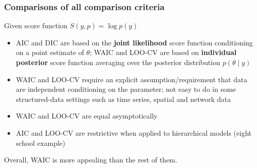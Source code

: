 \documentclass{beamer}
\begin{document}
\begin{frame}
  \frametitle{Comparisons of all comparison criteria}
Given score function $S(y, p) = \log p(y)$
  \begin{itemize}
  \item AIC and DIC are based on the {\bf joint likelihood} score function
    conditioning on a point estimate of $\theta$; WAIC and LOO-CV are
    based on {\bf individual posterior} score function averaging over the posterior distribution $p(\theta \mid
    y)$
\pause
\item WAIC and LOO-CV require an explicit assumption/requirement that data are
  independent conditioning on the parameter; not easy to do in some
  structured-data settings such as time series, spatial and network
  data
\pause
\item WAIC and LOO-CV are equal asymptotically 
\pause
\item AIC and LOO-CV are restrictive when applied to hierarchical
  models (eight school example)
\pause
  \end{itemize}

Overall, WAIC is more appealing than the rest of them.
\end{frame}
\end{document}
